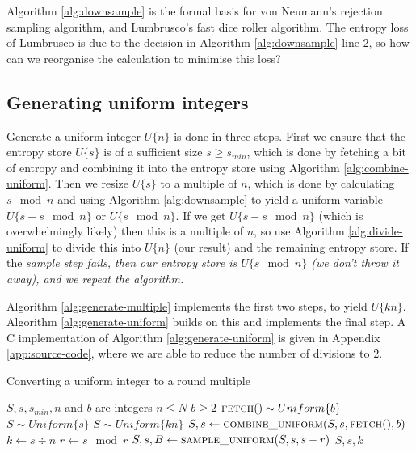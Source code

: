 \documentclass[12pt]{article}
\begin{document}
Algorithm \ref{alg:downsample} is the formal basis for von Neumann's rejection sampling algorithm, and Lumbrusco's fast dice roller algorithm. The entropy loss of Lumbrusco is due to the decision in Algorithm \ref{alg:downsample} line 2, so how can we reorganise the calculation to minimise this loss?

\subsection{Generating uniform integers}

Generate a uniform integer $U\{n\}$ is done in three steps. First we ensure that the entropy store $U\{s\}$ is of a sufficient size $s\ge s_{min}$, which is done by fetching a bit of entropy and combining it into the entropy store using Algorithm \ref{alg:combine-uniform}. Then we resize $U\{s\}$ to a multiple of $n$, which is done by calculating $s \mod n$ and using Algorithm \ref{alg:downsample} to yield a uniform variable $U\{s-s \mod n\}$ or $U\{s \mod n\}$. If we get $U\{s-s \mod n\}$ (which is overwhelmingly likely) then this is a multiple of $n$, so use Algorithm \ref{alg:divide-uniform} to divide this into $U\{n\}$ (our result) and the remaining entropy store. If the \em sample \em step fails, then our entropy store is $U\{s \mod n\}$ (we don't throw it away), and we repeat the algorithm.

Algorithm \ref{alg:generate-multiple} implements the first two steps, to yield $U\{kn\}$. Algorithm \ref{alg:generate-uniform} builds on this and implements the final step. A C implementation of Algorithm \ref{alg:generate-uniform} is given in Appendix \ref{app:source-code}, where we are able to reduce the number of divisions to 2.

\begin{algorithm}
\caption{Converting a uniform integer to a round multiple}
\label{alg:generate-multiple}
\begin{algorithmic}[1]
\Require $S, s, s_{min}, n$ and $b$ are integers
\Require $n \le N$
\Require $b \ge 2$
\Require $\textsc{fetch}() \sim Uniform\{b\}$
\Require $S \sim Uniform\{s\}$
\Ensure $S \sim Uniform\{kn\}$
        \State $S, s \gets \textsc{combine\_uniform}(S, s, \textsc{fetch}(), b)$
    \EndWhile
    \State $k \gets s \div n$
    \State $r \gets s \mod r$
    \State $S, s, B \gets \textsc{sample\_uniform}(S, s, s-r)$ 
        \State \Return $S, s, k$
    \EndIf
  \EndWhile
\EndProcedure
\end{algorithmic}
\end{algorithm}
\end{document}
